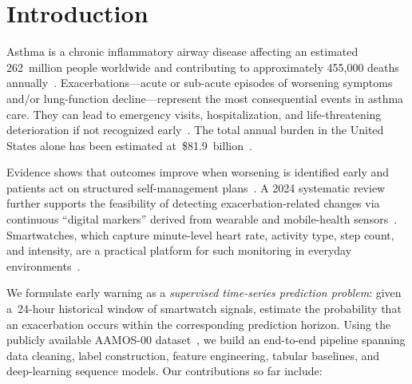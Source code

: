\documentclass[11pt,a4paper]{article}
\begin{document}
\tableofcontents
\newpage

\section{Introduction}\label{sec:intro}

Asthma is a chronic inflammatory airway disease affecting an estimated
262~million people worldwide and contributing to approximately 455{,}000 deaths
annually~\cite{who2024}.  Exacerbations—acute or sub-acute episodes of
worsening symptoms and/or lung-function decline—represent the most
consequential events in asthma care.  They can lead to emergency visits,
hospitalization, and life-threatening deterioration if not recognized
early~\cite{bourdin2019}.  The total annual burden in the United States alone
has been estimated at~\$81.9~billion~\cite{nurmagambetov2018}.

Evidence shows that outcomes improve when worsening is identified early and
patients act on structured self-management plans~\cite{pinnock2015}.  A 2024
systematic review further supports the feasibility of detecting
exacerbation-related changes via continuous ``digital markers'' derived from
wearable and mobile-health sensors~\cite{cokorudy2024}.  Smartwatches, which
capture minute-level heart rate, activity type, step count, and intensity, are a
practical platform for such monitoring in everyday
environments~\cite{taylor2020}.

We formulate early warning as a \emph{supervised time-series prediction
problem}: given a~24-hour historical window of smartwatch signals, estimate the
probability that an exacerbation occurs within the corresponding prediction
horizon.  Using the publicly available AAMOS-00 dataset~\cite{tsang2023}, we
build an end-to-end pipeline spanning data cleaning, label construction,
feature engineering, tabular baselines, and deep-learning sequence models.  Our
contributions so far include:
\end{document}
